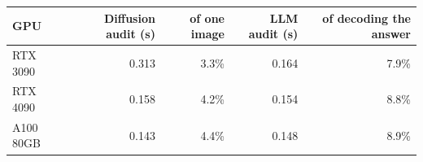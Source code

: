 \begin{tabular}{@{}lrrrr@{}}
\toprule
\textbf{GPU} & \textbf{Diffusion audit (s)} & \textbf{of one image} & \textbf{LLM audit (s)} & \textbf{of decoding the answer} \\
\midrule
RTX 3090 & 0.313 & 3.3\% & 0.164 & 7.9\% \\
RTX 4090 & 0.158 & 4.2\% & 0.154 & 8.8\% \\
A100 80GB & 0.143 & 4.4\% & 0.148 & 8.9\% \\
\bottomrule
\end{tabular}
